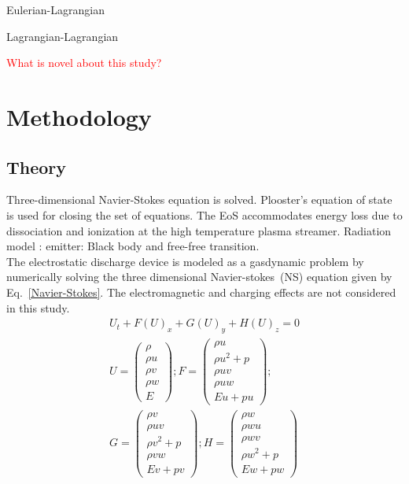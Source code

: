\documentclass[12pt]{aiaa-tc}
\begin{document}
Eulerian-Lagrangian

Lagrangian-Lagrangian 

\textcolor{red}{What is novel about this study?}\\

\newpage
\section{Methodology}
\subsection{Theory}


Three-dimensional Navier-Stokes equation is solved. Plooster's equation of state is used for closing the set of equations. The EoS accommodates energy loss due to dissociation and ionization at the high temperature plasma streamer. Radiation model : emitter: Black body and free-free transition.\\
The electrostatic discharge device is modeled as a gasdynamic problem by numerically solving the three dimensional Navier-stokes~(NS) equation given by Eq.~\ref{Navier-Stokes}. The electromagnetic and charging effects are not considered in this study.
\begin{equation}
   \begin{split}
            U_t+F(U)_x+G(U)_y+H(U)_z = 0\\
            U=\begin{pmatrix}
            \rho\\
            \rho u \\
            \rho v \\
            \rho w \\
            E
            \end{pmatrix} ;
            F = \begin{pmatrix}
            \rho u\\
            \rho u^2+p \\
            \rho u v\\
            \rho u w \\
            E u +p u
            \end{pmatrix};\\
            G = \begin{pmatrix}
            \rho v\\
            \rho u v \\
            \rho v^2 + p\\
            \rho v w \\
            E v +p v
            \end{pmatrix};
            H = \begin{pmatrix}
            \rho w\\
            \rho w u \\
            \rho w v\\
            \rho w^2 + p \\
            E w +p w
            \end{pmatrix}  
   \end{split}
   \label{Navier-Stokes}
\end{equation}
\end{document}
